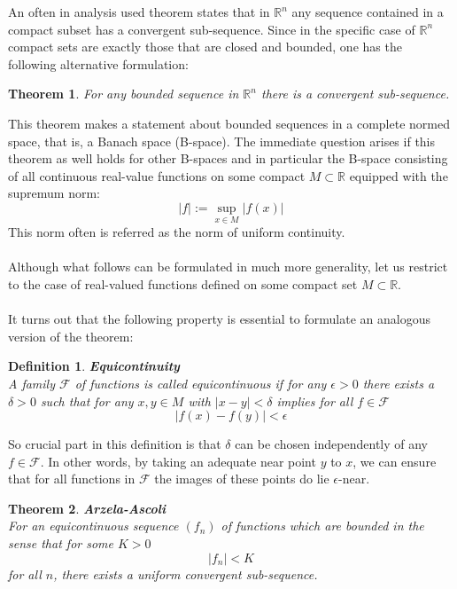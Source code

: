 \documentclass[17pt]{extarticle}
\newtheorem{theorem}{Theorem}
\newtheorem{definition}{Definition}
\begin{document}
An often in analysis used theorem states that in $\mathbb{R}^n$ any sequence contained
in a compact subset has a convergent sub-sequence.
Since in the specific case of $\mathbb{R}^n$ compact sets are exactly those that are closed
and bounded, one has the following alternative formulation:
\begin{theorem} \label{conv_sub_sequ_in_R}
	For any bounded sequence in $\mathbb{R}^n$ there is a convergent sub-sequence.
\end{theorem}
This theorem makes a statement about bounded sequences in a complete normed space, that is, a Banach space (B-space).
The immediate question arises if this theorem as well holds for other B-spaces and in particular
the B-space consisting of all continuous real-value functions on some compact $M\subset\mathbb{R}$ equipped with the supremum norm:
$$|f|:=\sup_{x\in M}|f(x)|$$
This norm often is referred as the norm of uniform continuity.\\ \\
Although what follows can be formulated in much more generality, let us restrict to the case of real-valued 
functions defined on some compact set $M\subset\mathbb{R}$.\\ \\
It turns out that the following property is essential to formulate an analogous version of the theorem:
\begin{definition}
	\textbf{Equicontinuity}\\
	A family $\mathcal{F}$ of functions is called equicontinuous if for any $\epsilon>0$ there exists a 
	$\delta >0$ such that for any $x,y\in M$ with $|x-y|<\delta$ implies for all $f\in\mathcal{F}$
	$$|f(x)-f(y)|<\epsilon$$
\end{definition}
So crucial part in this definition is that $\delta$ can be chosen independently of any $f\in\mathcal{F}$.
In other words, by taking an adequate near point $y$ to $x$, we can ensure that for all functions in $\mathcal{F}$ the images of these points do lie $\epsilon$-near.
\begin{theorem}
	\textbf{Arzela-Ascoli}\\
	For an equicontinuous sequence $(f_n)$ of functions which are bounded in the sense that for some $K>0$
	$$|f_n|<K$$
	for all $n$,
	there exists a uniform convergent sub-sequence.
\end{theorem}
\end{document}
